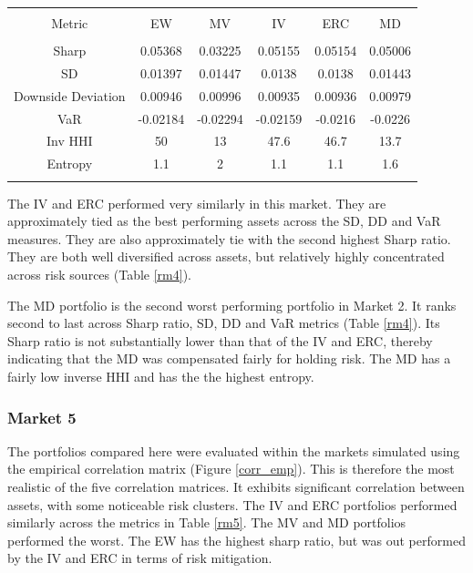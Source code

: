 \documentclass[11pt,preprint, authoryear]{elsarticle}
\let\origtable\table
\let\endorigtable\endtable
\renewenvironment{table}[1][2] {
    \expandafter\origtable\expandafter[H]
} {
    \endorigtable
}
\numberwithin{equation}{section}
\numberwithin{figure}{section}
\numberwithin{table}{section}
\begin{document}
\begin{table}[!htbp] \centering 
  \caption{Market 4 - Portfolio Risk Metrics} 
  \label{rm4} 
\begin{tabular}{@{\extracolsep{5pt}} cccccc} 
\\[-1.8ex]\hline 
\hline \\[-1.8ex] 
Metric & EW & MV & IV & ERC & MD \\ 
\hline \\[-1.8ex] 
Sharp & 0.05368 & 0.03225 & 0.05155 & 0.05154 & 0.05006 \\ 
SD & 0.01397 & 0.01447 & 0.0138 & 0.0138 & 0.01443 \\ 
Downside Deviation & 0.00946 & 0.00996 & 0.00935 & 0.00936 & 0.00979 \\ 
VaR & -0.02184 & -0.02294 & -0.02159 & -0.0216 & -0.0226 \\ 
Inv HHI & 50 & 13 & 47.6 & 46.7 & 13.7 \\ 
Entropy & 1.1 & 2 & 1.1 & 1.1 & 1.6 \\ 
\hline \\[-1.8ex] 
\end{tabular} 
\end{table}

The IV and ERC performed very similarly in this market. They are
approximately tied as the best performing assets across the SD, DD and
VaR measures. They are also approximately tie with the second highest
Sharp ratio. They are both well diversified across assets, but
relatively highly concentrated across risk sources (Table \ref{rm4}).

The MD portfolio is the second worst performing portfolio in Market 2.
It ranks second to last across Sharp ratio, SD, DD and VaR metrics
(Table \ref{rm4}). Its Sharp ratio is not substantially lower than that
of the IV and ERC, thereby indicating that the MD was compensated fairly
for holding risk. The MD has a fairly low inverse HHI and has the the
highest entropy.

\hypertarget{market-5}{%
\subsubsection{Market 5}\label{market-5}}

The portfolios compared here were evaluated within the markets simulated
using the empirical correlation matrix (Figure \ref{corr_emp}). This is
therefore the most realistic of the five correlation matrices. It
exhibits significant correlation between assets, with some noticeable
risk clusters. The IV and ERC portfolios performed similarly across the
metrics in Table \ref{rm5}. The MV and MD portfolios performed the
worst. The EW has the highest sharp ratio, but was out performed by the
IV and ERC in terms of risk mitigation.
\end{document}
